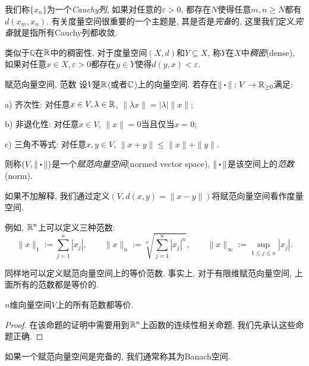 我们称$\{ x_n \}$为一个\textit{Cauchy列}, 如果对任意的$\varepsilon >0$, 都存在$N$使得任意$m,n \geq N$都有$d(x_m,x_n)$. 有关度量空间很重要的一个主题是, 其是否是\textit{完备}的, 这里我们定义\textit{完备}就是指所有Cauchy列都收敛. 

类似于$\mathbb{Q}$在$\mathbb{R}$中的稠密性, 对于度量空间$(X,d)$和$Y \subseteq X$, 称$Y$在$X$中\textit{稠密}(dense), 如果对任意$x \in X, \varepsilon >0$都存在$y \in Y$使得$d(y,x) < \varepsilon$. 

\begin{definition}{赋范向量空间, 范数}
	设$V$是$\mathbb{R}$(或者$\mathbb{C}$)上的向量空间. 若存在$\| \bigcdot \|:V \to \R _{\geq 0}$满足: 
	
	a) 齐次性: 对任意$x \in V, \lambda \in \mathbb{R}$, $\| \lambda x \|=|\lambda | \| x \|$; 
	
	b) 非退化性: 对任意$x \in V$, $\| x \|=0$当且仅当$x=0$; 
	
	c) 三角不等式: 对任意$x,y \in V$, $\| x+y \| \leq \| x \|+\| y \|$. 
	
	\noindent
	则称$(V,\| \bigcdot \| )$是一个\textit{赋范向量空间}(normed vector space), $\| \bigcdot \|$是该空间上的\textit{范数}(norm). 
\end{definition}
\begin{remark}
	如果不加解释, 我们通过定义$(V,d(x,y)=\| x-y \|)$将赋范向量空间看作度量空间. 
\end{remark}

例如, $\mathbb{R} ^n$上可以定义三种范数: $$\| x \|_1 := \sum_{j=1}^n |x_j|,\qquad \| x \|_n := \sqrt[n]{\sum_{j=1}^n |x_j|^n},\qquad \| x \|_{\infty} := \sup_{1 \leq j \leq n}|x_j|. $$

同样地可以定义赋范向量空间上的等价范数. 事实上, 对于有限维赋范向量空间, 上面所有的范数都是等价的. 

\begin{proposition}{}
	$n$维向量空间$V$上的所有范数都等价. 
\end{proposition}
\begin{proof}
	在该命题的证明中需要用到$\mathbb{R} ^n$上函数的连续性相关命题, 我们先承认这些命题正确. 
\end{proof}

如果一个赋范向量空间是完备的, 我们通常称其为Banach空间. 

